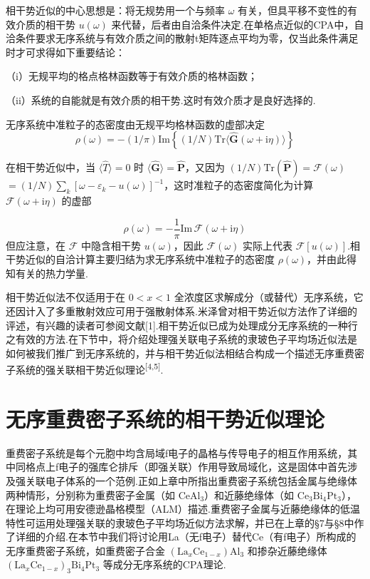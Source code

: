 相干势近似的中心思想是：将无规势用一个与频率 $\omega$ 有关，但具平移不变性的有效介质的相干势 $u\left(\omega\right)$ 来代替，后者由自洽条件决定.在单格点近似的CPA中，自洽条件要求无序系统与有效介质之间的散射t矩阵逐点平均为零，仅当此条件满足时才可求得如下重要结论：

（i）无规平均的格点格林函数等于有效介质的格林函数；

（ii）系统的自能就是有效介质的相干势.这时有效介质才是良好选择的.

无序系统中准粒子的态密度由无规平均格林函数的虚部决定
\begin{equation*}
  \rho\left(\omega\right)=-\left(1/\pi\right)\mathrm{Im}\left\{\left(1/N\right)\mathrm{Tr}\langle\hat{\boldsymbol{G}}\left(\omega+\mathrm{i}\eta\right)\rangle\right\}
\end{equation*}

{\sloppy
在相干势近似中，当 $\langle\hat{T}\rangle=0$ 时 $\langle\hat{\boldsymbol{G}}\rangle=\hat{\boldsymbol{P}}$，又因为 $\left(1/N\right)\mathrm{Tr}\left(\hat{\boldsymbol{P}}\right)=\mathscr{F}\left(\omega\right)$ $=\left(1/N\right)\sum_{k}\left[\omega-\varepsilon_{k}-u\left(\omega\right)\right]^{-1}$，这时准粒子的态密度简化为计算 $\mathscr{F}\left(\omega+\mathrm{i}\eta\right)$ 的虚部\par}
\begin{equation}
  \rho\left(\omega\right)=-\frac{1}{\pi}\mathrm{Im}\,\mathscr{F}\left(\omega+\mathrm{i}\eta\right)
\end{equation}
但应注意，在 $\mathscr{F}$ 中隐含相干势 $u\left(\omega\right)$，因此 $\mathscr{F}\left(\omega\right)$ 实际上代表 $\mathscr{F}\left[u\left(\omega\right)\right]$.相干势近似的自洽计算主要归结为求无序系统中准粒子的态密度 $\rho\left(\omega\right)$，并由此得知有关的热力学量.

相干势近似法不仅适用于在 $0<x<1$ 全浓度区求解成分（或替代）无序系统，它还因计入了多重散射效应可用于强散射体系.米泽曾对相干势近似方法作了详细的评述，有兴趣的读者可参阅文献[1].相干势近似已成为处理成分无序系统的一种行之有效的方法.在下节中，将介绍处理强关联电子系统的隶玻色子平均场近似法是如何被我们推广到无序系统的，并与相干势近似法相结合构成一个描述无序重费密子系统的强关联相干势近似理论\textsuperscript{[4,5]}.

\section{无序重费密子系统的相干势近似理论}

重费密子系统是每个元胞中均含局域f电子的晶格与传导电子的相互作用系统，其中同格点上f电子的强库仑排斥（即强关联）作用导致局域化，这是固体中首先涉及强关联电子体系的一个范例.正如上章中所指出重费密子系统包括金属与绝缘体两种情形，分别称为重费密子金属（如 $\mathrm{CeAl}_{3}$）和近藤绝缘体（如 $\mathrm{Ce}_{3}\mathrm{Bi}_{4}\mathrm{Pt}_{3}$），在理论上均可用安德逊晶格模型（ALM）描述.重费密子金属与近藤绝缘体的低温特性可运用处理强关联的隶玻色子平均场近似方法求解，并已在上章的§7与§8中作了详细的介绍.在本节中我们将讨论用La（无f电子）替代Ce（有f电子）所构成的无序重费密子系统，如重费密子合金 $\left(\mathrm{La}_{x}\mathrm{Ce}_{1-x}\right)\mathrm{Al}_{3}$ 和掺杂近藤绝缘体 $\left(\mathrm{La}_{x}\mathrm{Ce}_{1-x}\right)_{3}\mathrm{Bi}_{4}\mathrm{Pt}_{3}$ 等成分无序系统的CPA理论.

